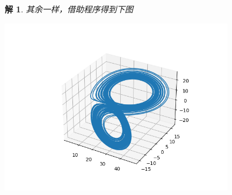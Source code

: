 \documentclass[10pt]{ctexart}
\newtheorem*{solution}{解}
\begin{document}
\begin{solution}
    其余一样，借助程序得到下图
    \begin{table}[H]
        \centering
        \includegraphics[width=10cm]{3.png}
        \caption{$\beta=\frac{8}{3},\rho=28,\sigma=5$}
    \end{table}
\end{solution}
\end{document}
